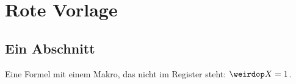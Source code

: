 \chapter{Rote Vorlage}\label{c98}

\section{Ein Abschnitt}\label{c98.s1}

Eine Formel mit einem Makro, das nicht im Register steht: $\weirdop X = 1$.
